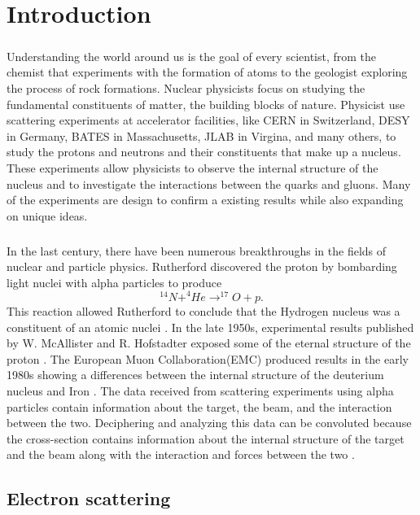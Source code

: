 


\chapter{Introduction}\paragraph{}Understanding the world around us is the goal of every scientist, from the chemist that experiments with the formation of atoms to the geologist exploring the process of rock formations. Nuclear physicists focus on studying the fundamental constituents of matter, the building blocks of nature. Physicist use scattering experiments at accelerator facilities, like CERN in Switzerland, DESY in Germany, BATES in Massachusetts, JLAB in Virgina, and many others, to study the protons and neutrons and their constituents that make up a nucleus. These experiments allow physicists to observe the internal structure of the nucleus and to investigate the interactions between the quarks and gluons. Many of the experiments are design to confirm a existing results while also expanding on unique ideas.
\paragraph{}In the last century, there have been numerous breakthroughs in the fields of nuclear and particle physics. Rutherford discovered the proton by bombarding light nuclei with alpha particles to produce 
	\begin{equation}
	^{14}N + ^4He \rightarrow ^{17}O + p.
	\end{equation}
This reaction allowed Rutherford to conclude that the Hydrogen nucleus was a constituent of an atomic nuclei \cite{PnN}. In the late 1950s, experimental results published by W. McAllister and R. Hofstadter exposed some of the eternal structure of the proton \cite{Flay,Hof}. The European Muon Collaboration(EMC) produced results in the early 1980s showing a differences between the internal structure of the deuterium nucleus and Iron \cite{seeley,CC}. The data received from scattering experiments using alpha particles contain information about the target, the beam, and the interaction between the two. Deciphering and analyzing this data can be convoluted because the cross-section contains information about the internal structure of the target and the beam along with the interaction and forces between the two \cite{PnN}.  

\section{Electron scattering}
